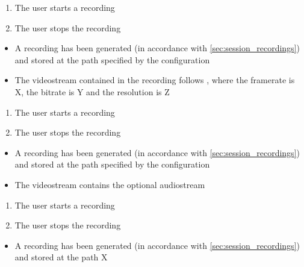\begin{tests}
    {\begin{enumerate}
        \item The \gls{user} starts a recording
        \item The \gls{user} stops the recording
    \end{enumerate}}
    {\begin{itemize}
        \item A recording has been generated (in accordance with \ref{sec:session_recordings}) and stored at the path specified by the configuration
        \item The videostream contained in the recording follows , where the framerate is X, the bitrate is Y and the resolution is Z
    \end{itemize}}

    {\begin{enumerate}
        \item The \gls{user} starts a recording
        \item The \gls{user} stops the recording
    \end{enumerate}}
    {\begin{itemize}
        \item A recording has been generated (in accordance with \ref{sec:session_recordings}) and stored at the path specified by the configuration
        \item The videostream contains the optional audiostream
    \end{itemize}}

    {\begin{enumerate}
        \item The \gls{user} starts a recording
        \item The \gls{user} stops the recording
    \end{enumerate}}
    {\begin{itemize}
        \item A recording has been generated (in accordance with \ref{sec:session_recordings}) and stored at the path X
    \end{itemize}}


\end{tests}
